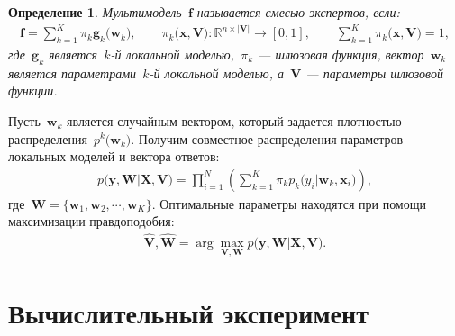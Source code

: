 \documentclass[12pt, twoside]{article}
\newtheorem{definition}{Определение}
\begin{document}
\begin{definition}
\label{def:2}
Мультимодель~$\mathbf{f}$ называется смесью экспертов, если:
\[
\label{eq:st:2}
\begin{aligned}
\mathbf{f} = \sum_{k=1}^{K}\pi_{k}\mathbf{g}_k\bigr(\mathbf{w}_k\bigr), \qquad \pi_{k}\bigr(\mathbf{x}, \mathbf{V}\bigr):\mathbb{R}^{n\times \left|\mathbf{V}\right|} \to [0, 1], \qquad \sum_{k=1}^{K}\pi_{k}\bigr(\mathbf{x}, \mathbf{V}\bigr) = 1,
\end{aligned}
\]
где~$\mathbf{g}_k$ является~$k$-й локальной моделью,~$\pi_k$ --- шлюзовая функция, вектор~$\mathbf{w}_k$ является параметрами~$k$-й локальной моделью, а~$\mathbf{V}$ --- параметры шлюзовой функции.
\end{definition}

Пусть~$\mathbf{w}_k$ является случайным вектором, который задается плотностью распределения~$p^{k}\bigr(\mathbf{w}_k\bigr)$. Получим совместное распределения параметров локальных моделей и вектора ответов:
\[
\label{eq:st:3}
\begin{aligned}
p\bigr(\mathbf{y}, \mathbf{W}|\mathbf{X}, \mathbf{V}\bigr) = \prod_{i=1}^{N}\left(\sum_{k=1}^{K}\pi_{k}p_{k}\bigr(y_i|\mathbf{w}_k, \mathbf{x}_i\bigr)\right),
\end{aligned}
\]
где~$\mathbf{W} = \bigr\{\mathbf{w}_1, \mathbf{w}_2, \cdots, \mathbf{w}_K\bigr\}.$
Оптимальные параметры находятся при помощи максимизации правдоподобия:
\[
\label{eq:st:4}
\begin{aligned}
\hat{\mathbf{V}}, \hat{ \mathbf{W}} = \arg\max_{\mathbf{V}, \mathbf{W}} p\bigr(\mathbf{y},  \mathbf{W}|\mathbf{X}, \mathbf{V}\bigr).
\end{aligned}
\]

\section{Вычислительный эксперимент}
\end{document}
